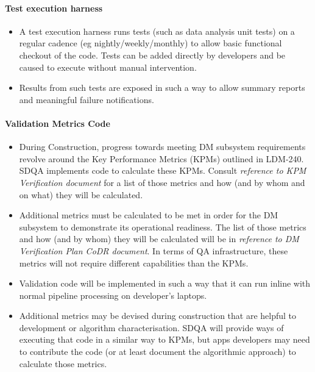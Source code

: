 \paragraph{Test execution harness}
\label{sec:qaTestharness}
\begin{itemize}

\item A test execution harness runs tests (such as data analysis unit tests) on a regular cadence (eg nightly/weekly/monthly) to allow basic functional checkout of the code. Tests can be added directly by developers and be caused to execute without manual intervention.

\item Results from such tests are exposed in such a way to allow summary reports and meaningful failure notifications.

\end{itemize}

\paragraph{Validation Metrics Code}
\label{sec:qaValidate}
\begin{itemize}

\item During Construction, progress towards meeting DM subsystem requirements revolve around the Key Performance Metrics (KPMs) outlined in LDM-240. SDQA implements code to calculate these KPMs. Consult \emph{ reference to KPM Verification document} for a list of those metrics and how (and by whom and on what) they will be calculated.

\item Additional metrics must be calculated to be met in order for the DM subsystem to demonstrate its operational readiness. The list of those metrics and how (and by whom) they will be calculated will be in \emph{reference to DM Verification Plan CoDR document}. In terms of QA infrastructure, these metrics will not require different capabilities than the KPMs.

\item Validation code will be implemented in such a way that it can run inline with normal pipeline processing on developer's laptops.

\item Additional metrics may be devised during construction that are helpful to development or algorithm characterisation. SDQA will provide ways of executing that code in a similar way to KPMs, but apps developers may need to contribute the code (or at least document the algorithmic approach) to calculate those metrics.

\end{itemize}

